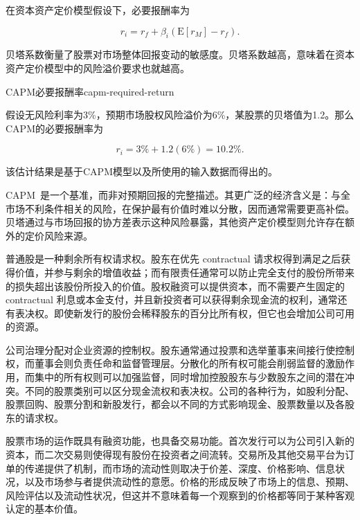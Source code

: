 在资本资产定价模型假设下，必要报酬率为

\begin{equation}
r_i
=
r_f
+
\beta_i\left(\mathrm{E}[r_M]-r_f\right).
\label{eq:ch9-capm}
\end{equation}

贝塔系数衡量了股票对市场整体回报变动的敏感度。贝塔系数越高，意味着在资本资产定价模型中的风险溢价要求也就越高。

\begin{example}{CAPM必要报酬率}{capm-required-return}

假设无风险利率为3\%，预期市场股权风险溢价为6\%，某股票的贝塔值为1.2。那么CAPM的必要报酬率为

\[
r_i
=
3\%+1.2(6\%)
=
10.2\%.
\]

该估计结果是基于CAPM模型以及所使用的输入数据而得出的。

\end{example}

CAPM~是一个基准，而非对预期回报的完整描述。其更广泛的经济含义是：与全市场不利条件相关的风险，在保护最有价值时难以分散，因而通常需要更高补偿。贝塔通过与市场回报的协方差表示这种风险暴露，其他资产定价模型则允许存在额外的定价风险来源。



普通股是一种剩余所有权请求权。股东在优先 contractual 请求权得到满足之后获得价值，并参与剩余的增值收益；而有限责任通常可以防止完全支付的股份所带来的损失超出该股份所投入的价值。股权融资可以提供资本，而不需要产生固定的 contractual 利息或本金支付，并且新投资者可以获得剩余现金流的权利，通常还有表决权。即使新发行的股份会稀释股东的百分比所有权，但它也会增加公司可用的资源。

公司治理分配对企业资源的控制权。股东通常通过投票和选举董事来间接行使控制权，而董事会则负责任命和监督管理层。分散化的所有权可能会削弱监督的激励作用，而集中的所有权则可以加强监督，同时增加控股股东与少数股东之间的潜在冲突。不同的股票类别可以区分现金流权和表决权。公司的各种行为，如股利分配、股票回购、股票分割和新股发行，都会以不同的方式影响现金、股票数量以及各股东的请求权。

股票市场的运作既具有融资功能，也具备交易功能。首次发行可以为公司引入新的资本，而二次交易则使得现有股份在投资者之间流转。交易所及其他交易平台为订单的传递提供了机制，而市场的流动性则取决于价差、深度、价格影响、信息状况，以及市场参与者提供流动性的意愿。价格的形成反映了市场上的信息、预期、风险评估以及流动性状况，但这并不意味着每一个观察到的价格都等同于某种客观认定的基本价值。

